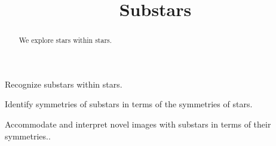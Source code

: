 \documentclass[noauthor,nooutcomes,12pt,hints,handout]{ximera}
\title{Substars}
\begin{document}
\begin{abstract}
  We explore stars within stars.
\end{abstract}
\maketitle

\begin{listOutcomes}
\item Recognize substars within stars.
\item Identify symmetries of substars in terms of the symmetries of
  stars.
\item Accommodate and interpret novel images with substars in terms of
  their symmetries..
\end{listOutcomes}


\mynewpage
\end{document}
